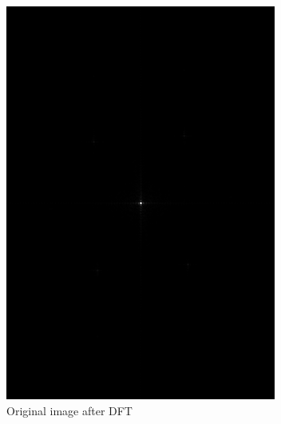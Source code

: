 \documentclass[
	12pt, %
]{style/fphw}
\begin{document}
\begin{figure}[H]
    \centering
    \begin{subfigure}[b]{.3\textwidth}
         \centering
         \includegraphics[width=\textwidth]{Q5_2_spectrum.png}
         \caption{Original image after DFT}
         \label{Q5_2_spectrum}
     \end{subfigure}
     \hfill
     \begin{subfigure}[b]{.3\textwidth}
         \centering

\end{subfigure}
\end{figure}
\end{document}
